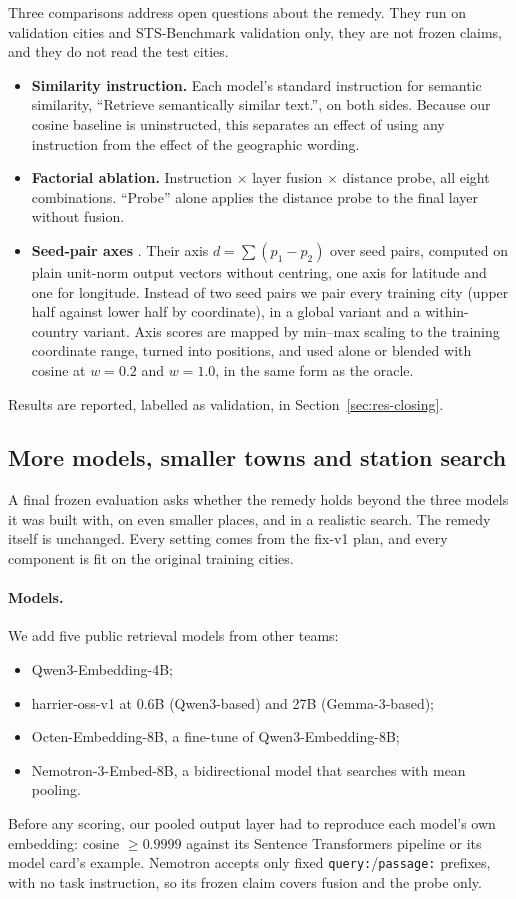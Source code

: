 Three comparisons address open questions about the remedy. They run on validation cities and STS-Benchmark validation only, they are not frozen claims, and they do not read the test cities.
\begin{itemize}
\item \textbf{Similarity instruction.} Each model's standard instruction for semantic similarity, ``Retrieve semantically similar text.'', on both sides. Because our cosine baseline is uninstructed, this separates an effect of using any instruction from the effect of the geographic wording.
\item \textbf{Factorial ablation.} Instruction $\times$ layer fusion $\times$ distance probe, all eight combinations. ``Probe'' alone applies the distance probe to the final layer without fusion.
\item \textbf{Seed-pair axes} \citep{feuerstein2026recovering}. Their axis $d=\sum(p_1-p_2)$ over seed pairs, computed on plain unit-norm output vectors without centring, one axis for latitude and one for longitude. Instead of two seed pairs we pair every training city (upper half against lower half by coordinate), in a global variant and a within-country variant. Axis scores are mapped by min--max scaling to the training coordinate range, turned into positions, and used alone or blended with cosine at $w=0.2$ and $w=1.0$, in the same form as the oracle.
\end{itemize}
Results are reported, labelled as validation, in Section~\ref{sec:res-closing}.

\subsection{More models, smaller towns and station search}
\label{sec:method-more}

A final frozen evaluation asks whether the remedy holds beyond the three models it was built with, on even smaller places, and in a realistic search. The remedy itself is unchanged. Every setting comes from the fix-v1 plan, and every component is fit on the original training cities.

\paragraph{Models.} We add five public retrieval models from other teams:
\begin{itemize}
\item Qwen3-Embedding-4B;
\item harrier-oss-v1 at 0.6B (Qwen3-based) and 27B (Gemma-3-based);
\item Octen-Embedding-8B, a fine-tune of Qwen3-Embedding-8B;
\item Nemotron-3-Embed-8B, a bidirectional model that searches with mean pooling.
\end{itemize}
Before any scoring, our pooled output layer had to reproduce each model's own embedding: cosine $\geq 0.9999$ against its Sentence Transformers pipeline or its model card's example. Nemotron accepts only fixed \texttt{query:}/\texttt{passage:} prefixes, with no task instruction, so its frozen claim covers fusion and the probe only.

